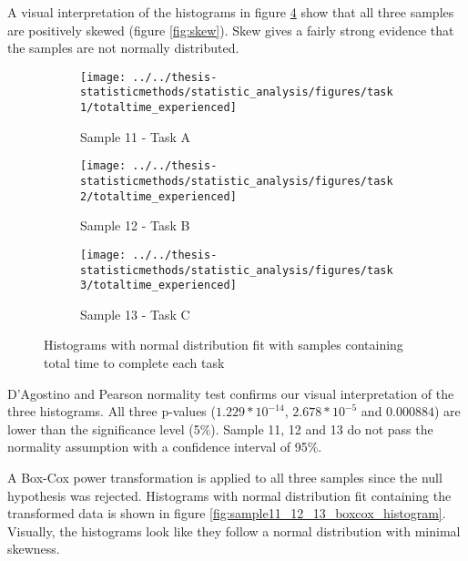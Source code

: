 A visual interpretation of the histograms in figure \ref{fig:sample11_12_13_histogram} show that all three samples are positively skewed (figure \ref{fig:skew}). Skew gives a fairly strong evidence that the samples are not normally distributed.

 \begin{figure}[H]
 	\centering
	 \begin{subfigure}[b]{0.32\textwidth}
	 	\centering
	 	\texttt{[image: ../../thesis-statisticmethods/statistic\_analysis/figures/task1/totaltime\_experienced]}
	 	\caption{Sample 11 - Task A}
	 	\label{fig:totaltimeexperienced_task1}
	 \end{subfigure}
	 \begin{subfigure}[b]{0.32\textwidth}
	 	\centering
	 	\texttt{[image: ../../thesis-statisticmethods/statistic\_analysis/figures/task2/totaltime\_experienced]}
	 	\caption{Sample 12 - Task B}
	 	\label{fig:totaltimeexperienced_task2}
	 \end{subfigure}
	 \begin{subfigure}[b]{0.32\textwidth}
	 	\centering
	 	\texttt{[image: ../../thesis-statisticmethods/statistic\_analysis/figures/task3/totaltime\_experienced]}
	 	\caption{Sample 13 - Task C}
	 	\label{fig:totaltimeexperienced}
	 \end{subfigure}
 	\caption{Histograms with normal distribution fit with samples containing total time to complete each task}
 	\label{fig:sample11_12_13_histogram}
 \end{figure}
 
D'Agostino and Pearson normality test confirms our visual interpretation of the three histograms. All three p-values ($1.229 * 10^{-14}$, $2.678 * 10^{-5}$ and $0.000884$) are lower than the significance level (5\%). Sample 11, 12 and 13 do not pass the normality assumption with a confidence interval of 95\%. 

A Box-Cox power transformation is applied to all three samples since the null hypothesis was rejected. Histograms with normal distribution fit containing the transformed data is shown in figure \ref{fig:sample11_12_13_boxcox_histogram}. Visually, the histograms look like they follow a normal distribution with minimal skewness. 

